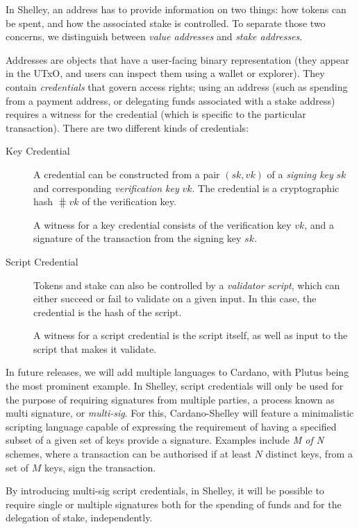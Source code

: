 \documentclass[11pt,a4paper,dvipsnames,twosided]{article}
\begin{document}
In Shelley, an address has to provide information on two things: how tokens can
be spent, and how the associated stake is controlled. To separate those two
concerns, we distinguish between \emph{value addresses} and \emph{stake
  addresses}.

Addresses are objects that have a user-facing binary representation (they appear
in the UTxO, and users can inspect them using a wallet or explorer). They
contain \emph{credentials} that govern access rights; using an address (such as
spending from a payment address, or delegating funds associated with a stake
address) requires a witness for the credential (which is specific to the
particular transaction). There are two different kinds of credentials:

\begin{description}
\item[Key Credential] A credential can be constructed from a pair \((sk,
  vk)\) of a \emph{signing key} \(sk\) and corresponding \emph{verification key}
  \(vk\). The credential is a cryptographic hash \(\hash{vk}\) of the
  verification key.

  A witness for a key credential consists of the verification key \(vk\), and a
  signature of the transaction from the signing key \(sk\).
\item[Script Credential] Tokens and stake can also be controlled by a
  \emph{validator script}, which can either succeed or fail to validate on a
  given input. In this case, the credential is the hash of the script.

  A witness for a script credential is the script itself, as well as input to
  the script that makes it validate.
\end{description}

In future releases, we will add multiple languages to Cardano, with Plutus being
the most prominent example. In Shelley, script credentials will only be used for
the purpose of requiring signatures from multiple parties, a process known as
multi signature, or \emph{multi-sig}. For this, Cardano-Shelley will feature a
minimalistic scripting language capable of expressing the requirement of having
a specified subset of a given set of keys provide a signature. Examples include
\emph{M of N} schemes, where a transaction can be authorised if at least \(N\)
distinct keys, from a set of \(M\) keys, sign the transaction.

By introducing multi-sig script credentials, in Shelley, it will be possible to
require single or multiple signatures both for the spending of funds and for the
delegation of stake, independently.
\end{document}
